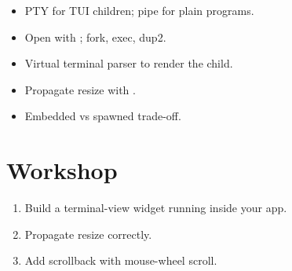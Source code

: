 \begin{recap}
\begin{itemize}[leftmargin=*]
  \item PTY for TUI children; pipe for plain programs.
  \item Open with ; fork, exec, dup2.
  \item Virtual terminal parser to render the child.
  \item Propagate resize with .
  \item Embedded vs spawned trade-off.
\end{itemize}
\end{recap}

\section*{Workshop}

\begin{enumerate}[leftmargin=*]
  \item Build a terminal-view widget running 
    inside your app.
  \item Propagate resize correctly.
  \item Add scrollback with mouse-wheel scroll.
\end{enumerate}
